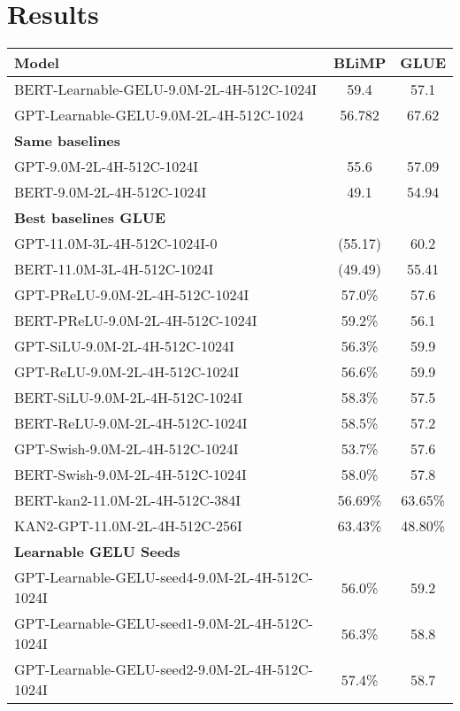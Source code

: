 \section{Results}
\begin{table}[ht]
    \centering
    \begin{tabular}{lcc}
    \hline
    \textbf{Model} & \textbf{BLiMP} & \textbf{GLUE} \\
    \hline
    BERT-Learnable-GELU-9.0M-2L-4H-512C-1024I & 59.4 & 57.1 \\
    GPT-Learnable-GELU-9.0M-2L-4H-512C-1024   & 56.782 & 67.62 \\
    \hline
    \multicolumn{3}{l}{\textbf{Same baselines}} \\
    GPT-9.0M-2L-4H-512C-1024I & 55.6 & 57.09 \\
    BERT-9.0M-2L-4H-512C-1024I & 49.1 & 54.94 \\
    \hline
    \multicolumn{3}{l}{\textbf{Best baselines GLUE}} \\
    GPT-11.0M-3L-4H-512C-1024I-0 & (55.17) & 60.2 \\
    BERT-11.0M-3L-4H-512C-1024I & (49.49) & 55.41 \\
    \hline
    GPT-PReLU-9.0M-2L-4H-512C-1024I & 57.0\% & 57.6 \\
    BERT-PReLU-9.0M-2L-4H-512C-1024I & 59.2\% & 56.1 \\
    GPT-SiLU-9.0M-2L-4H-512C-1024I & 56.3\% & 59.9 \\
    GPT-ReLU-9.0M-2L-4H-512C-1024I & 56.6\% & 59.9 \\
    BERT-SiLU-9.0M-2L-4H-512C-1024I & 58.3\% & 57.5 \\
    BERT-ReLU-9.0M-2L-4H-512C-1024I & 58.5\% & 57.2 \\
    GPT-Swish-9.0M-2L-4H-512C-1024I & 53.7\% & 57.6 \\
    BERT-Swish-9.0M-2L-4H-512C-1024I & 58.0\% & 57.8 \\
    BERT-kan2-11.0M-2L-4H-512C-384I & 56.69\% & 63.65\% \\
    KAN2-GPT-11.0M-2L-4H-512C-256I & 63.43\% & 48.80\% \\
    \hline
    \multicolumn{3}{l}{\textbf{Learnable GELU Seeds}} \\
    GPT-Learnable-GELU-seed4-9.0M-2L-4H-512C-1024I & 56.0\% & 59.2 \\
    GPT-Learnable-GELU-seed1-9.0M-2L-4H-512C-1024I & 56.3\% & 58.8 \\
    GPT-Learnable-GELU-seed2-9.0M-2L-4H-512C-1024I & 57.4\% & 58.7 \\

\end{tabular}
\end{table}
